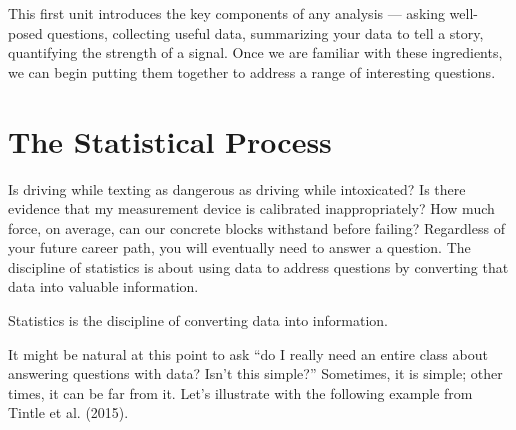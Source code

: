 \documentclass[
  letterpaper,
  DIV=11,
  numbers=noendperiod]{scrreprt}
\theoremstyle{plain}
\theoremstyle{definition}
\theoremstyle{definition}
\theoremstyle{remark}
\begin{document}
This first unit introduces the key components of any analysis --- asking
well-posed questions, collecting useful data, summarizing your data to
tell a story, quantifying the strength of a signal. Once we are familiar
with these ingredients, we can begin putting them together to address a
range of interesting questions.

\chapter{The Statistical Process}\label{sec-basics}

Is driving while texting as dangerous as driving while intoxicated? Is
there evidence that my measurement device is calibrated inappropriately?
How much force, on average, can our concrete blocks withstand before
failing? Regardless of your future career path, you will eventually need
to answer a question. The discipline of statistics is about using data
to address questions by converting that data into valuable information.

\begin{tcolorbox}[enhanced jigsaw, breakable, titlerule=0mm, colframe=quarto-callout-tip-color-frame, bottomtitle=1mm, opacityback=0, rightrule=.15mm, toptitle=1mm, arc=.35mm, bottomrule=.15mm, left=2mm, title=\textcolor{quarto-callout-tip-color}{\faLightbulb}\hspace{0.5em}{Big Idea}, leftrule=.75mm, coltitle=black, toprule=.15mm, colbacktitle=quarto-callout-tip-color!10!white, colback=white, opacitybacktitle=0.6]

Statistics is the discipline of converting data into information.

\end{tcolorbox}

It might be natural at this point to ask ``do I really need an entire
class about answering questions with data? Isn't this simple?''
Sometimes, it is simple; other times, it can be far from it. Let's
illustrate with the following example from Tintle et al. (2015).
\end{document}
